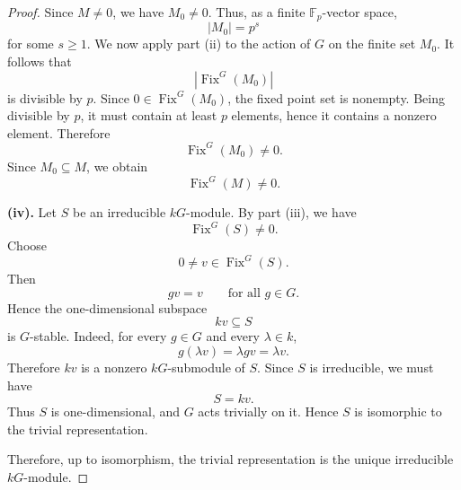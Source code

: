 \begin{proof}
    Since \(M\neq 0\), we have \(M_0\neq 0\). Thus, as a finite
    \(\mathbb{F}_p\)-vector space,
    \[
        |M_0|=p^s
    \]
    for some \(s\geq 1\). We now apply part \textup{(ii)} to the action of \(G\) on the
    finite set \(M_0\). It follows that
    \[
        |\operatorname{Fix}^G(M_0)|
    \]
    is divisible by \(p\). Since \(0\in \operatorname{Fix}^G(M_0)\), the fixed point set is
    nonempty. Being divisible by \(p\), it must contain at least \(p\) elements, hence it
    contains a nonzero element. Therefore
    \[
        \operatorname{Fix}^G(M_0)\neq 0.
    \]
    Since \(M_0\subseteq M\), we obtain
    \[
        \operatorname{Fix}^G(M)\neq 0.
    \]

    \textbf{(iv).}
    Let \(S\) be an irreducible \(kG\)-module. By part \textup{(iii)}, we have
    \[
        \operatorname{Fix}^G(S)\neq 0.
    \]
    Choose
    \[
        0\neq v\in \operatorname{Fix}^G(S).
    \]
    Then
    \[
        gv=v
        \qquad
        \text{for all } g\in G.
    \]
    Hence the one-dimensional subspace
    \[
        kv\subseteq S
    \]
    is \(G\)-stable. Indeed, for every \(g\in G\) and every \(\lambda\in k\),
    \[
        g(\lambda v)=\lambda gv=\lambda v.
    \]
    Therefore \(kv\) is a nonzero \(kG\)-submodule of \(S\). Since \(S\) is irreducible,
    we must have
    \[
        S=kv.
    \]
    Thus \(S\) is one-dimensional, and \(G\) acts trivially on it. Hence \(S\) is
    isomorphic to the trivial representation.

    Therefore, up to isomorphism, the trivial representation is the unique irreducible
    \(kG\)-module.
\end{proof}